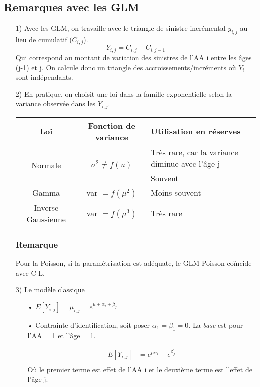 \documentclass[11pt,french]{report}
\begin{document}
\subsection*{Remarques avec les GLM}
\begin{itemize}
\item[1)] Avec les GLM, on travaille avec le triangle de sinistre incrémental $y_{i,j}$ au lieu de cumulatif ($C_{i,j}$).
$$ Y_{i,j} = C_{i,j} - C_{i,j-1}$$
Qui correspond au montant de variation des sinistres de l'AA i entre les âges (j-1) et j.
On calcule donc un triangle des accroissements/incréments où $Y_i$ sont indépendants. 
\item[2)] En pratique, on choisit une loi dans la famille exponentielle selon la variance observée dans les $Y_{i,j}$.
\bigskip

\begin{center}
\begin{tabularx}{\textwidth}{|c|c|X|}
  \hline
   Loi & Fonction de variance & Utilisation en réserves  \\
  \hline
  \multirow{2}{*}{Normale} & \multirow{2}{*}{$\sigma^2 \neq f(u)$} & Très rare, car la variance diminue avec l'âge j \\
  Poisson & $\mu$ & Souvent \\
  Gamma & var $ = f(\mu^2)$ & Moins souvent \\
  Inverse Gaussienne & var $ = f(\mu^3)$ & Très rare  \\
  \hline
\end{tabularx}
\end{center}
\subsubsection*{Remarque}
Pour la Poisson, si la paramétrisation est adéquate, le GLM Poisson coïncide  avec C-L.

\item[3)] Le modèle classique
\begin{itemize}
\item[•] $E[Y_{i,j}] = \mu_{i,j} = e^{\mu + \alpha_i + \beta_j}$
\item[•] Contrainte d'identification, soit poser $\alpha_1 = \beta_1 = 0$. La \textit{base} est pour l'AA = 1 et l'âge = 1.

\begin{align*}
E[Y_{i,j}] &= e^{\mu \alpha_i} + e^{\beta_j} \\
\end{align*}
Où le premier terme est effet de l'AA i et le deuxième terme est l'effet de l'âge j.
\end{itemize}


\end{itemize}
\end{document}
